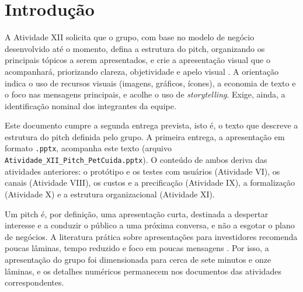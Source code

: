 \section{Introdução}
\label{sec:introducao}

A Atividade XII solicita que o grupo, com base no modelo de negócio desenvolvido até o momento, defina a estrutura do pitch, organizando os principais tópicos a serem apresentados, e crie a apresentação visual que o acompanhará, priorizando clareza, objetividade e apelo visual \cite{pucminas2026xii}. A orientação indica o uso de recursos visuais (imagens, gráficos, ícones), a economia de texto e o foco nas mensagens principais, e acolhe o uso de \textit{storytelling}. Exige, ainda, a identificação nominal dos integrantes da equipe.

Este documento cumpre a segunda entrega prevista, isto é, o texto que descreve a estrutura do pitch definida pelo grupo. A primeira entrega, a apresentação em formato \texttt{.pptx}, acompanha este texto (arquivo \texttt{Atividade\_XII\_Pitch\_PetCuida.pptx}). O conteúdo de ambos deriva das atividades anteriores: o protótipo e os testes com usuários (Atividade VI), os canais (Atividade VIII), os custos e a precificação (Atividade IX), a formalização (Atividade X) e a estrutura organizacional (Atividade XI).

Um pitch é, por definição, uma apresentação curta, destinada a despertar interesse e a conduzir o público a uma próxima conversa, e não a esgotar o plano de negócios. A literatura prática sobre apresentações para investidores recomenda poucas lâminas, tempo reduzido e foco em poucas mensagens \cite{kawasaki2004}. Por isso, a apresentação do grupo foi dimensionada para cerca de sete minutos e onze lâminas, e os detalhes numéricos permanecem nos documentos das atividades correspondentes.

